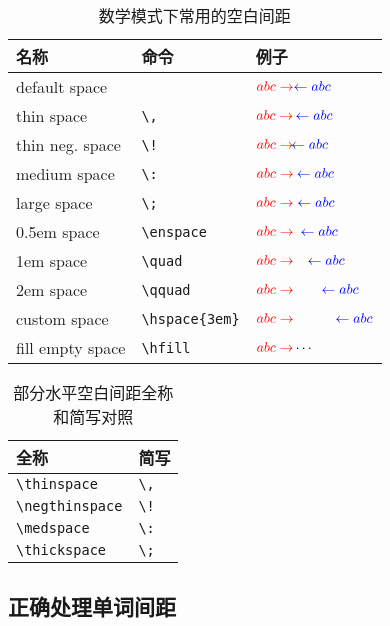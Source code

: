 \begin{table}[h]
    \newcommand\rlArrow[1]{\ensuremath{\color{red}{abc \rightarrow} #1 \color{blue}{\leftarrow abc}}}
    \centering
    \caption{数学模式下常用的空白间距\protect\footnotemark}
    \begin{tabular}{lll}
        \toprule[2pt]
        名称 & 命令 & 例子\\
        \midrule
        default space & & \rlArrow{}\\
        thin space & \verb|\,| & \rlArrow{\,}\\
        thin neg. space & \verb|\!| & \rlArrow{\!}\\
        medium space & \verb|\:| & \rlArrow{\:}\\
        large space & \verb|\;| & \rlArrow{\;}\\
        0.5em space & \verb|\enspace| & \rlArrow{\enspace}\\
        1em space & \verb|\quad| & \rlArrow{\quad}\\
        2em space & \verb|\qquad| & \rlArrow{\qquad}\\
        custom space & \verb|\hspace{3em}| & \rlArrow{\hspace{3em}}\\
        fill empty space & \verb|\hfill| & $\color{red}{abc \rightarrow} \color{black}\cdots$\\
        \bottomrule
    \end{tabular}
\end{table}

\begin{table}[h]
    \centering
    \begin{tabular}{ll}
        \toprule
        全称 & 简写 \\
        \midrule
        \verb|\thinspace| & \verb|\,| \\
        \verb|\negthinspace| & \verb|\!| \\
        \verb|\medspace| & \verb|\:|  \\
        \verb|\thickspace| & \verb|\;|\\
        \bottomrule
    \end{tabular}
    \caption{部分水平空白间距全称和简写对照}
\end{table}



\subsection{正确处理单词间距}

